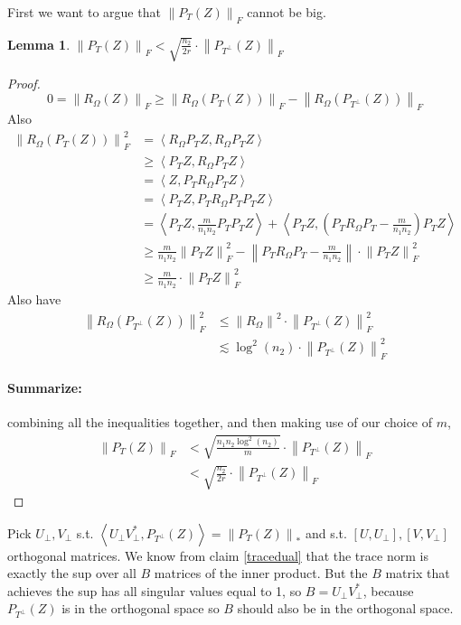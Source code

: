 \documentclass[11pt]{article}
\newcommand{\inprod}[1]{\left\langle #1 \right\rangle}
\newcommand{\norm}[1]{\left\| #1 \right\|}
\newtheorem{lemma}[theorem]{Lemma}
\begin{document}
First we want to argue that $\norm{P_T(Z)}_F$ cannot be big.
\begin{lemma}
\label{boundptz}
$\norm{P_T(Z)}_F  < \sqrt{\frac{n_2}{2r}} \cdot \norm{P_{T^\perp} (Z)}_F$
\end{lemma}
\begin{proof}
 \[ 0 = \norm{R_\Omega (Z)}_F \ge \norm{R_\Omega (P_T (Z)  )}_F - \norm{R_\Omega (P_{T^\perp} (Z))  }_F
\] 
Also
\begin{align*}
\norm{R_\Omega (P_T(Z))}_F^2 &= \inprod{R_\Omega P_T Z, R_\Omega P_T Z} \\
&\ge \inprod{P_T Z, R_\Omega P_T Z} \\
&= \inprod{Z, P_T R_\Omega P_T Z} \\
&= \inprod{ P_T Z, P_T R_\Omega P_T P_T Z} \\
&= \inprod{P_T Z, \frac{m}{n_1 n_2} P_T P_T Z} + \inprod{P_T Z, (P_T R_\Omega P_T - \frac{m}{n_1 n_2}) P_T Z} \\
&\ge \frac{m}{n_1 n_2 } \norm{P_T Z}_F^2 - \norm{P_T R_\Omega P_T - \frac{m}{n_1 n_2}} \cdot \norm{P_T Z}_F^2 \\
&\ge \frac{m}{n_1 n_2} \cdot \norm{P_T Z}_F^2
\end{align*}
Also have 
\begin{align*}
\norm{R_\Omega ( P_{T^\perp} (Z) )}_F^2 &\le \norm{R_\Omega}^2 \cdot \norm{P_{T^\perp} (Z)}_F^2 \\
&\lesssim \log^2(n_2) \cdot \norm{P_{T^\perp} (Z) }_F^2
\end{align*}

\paragraph{Summarize:} combining all the inequalities together, and then making use of our choice of $m$,
\begin{align*}
\norm{P_T (Z)}_F &< \sqrt{ \frac{n_1 n_2 \log^2 (n_2)}{m}  } \cdot \norm{P_{T^\perp} (Z)}_F  \\
& < \sqrt{\frac{n_2}{2r}} \cdot \norm{P_{T^\perp} (Z)}_F
\end{align*}
\end{proof}



 Pick $U_\perp, V_\perp$ s.t. $\inprod{U_\perp V_\perp^*, P_{T^\perp} (Z)} = \norm{P_T(Z)}_*$ and s.t. $[U, U_\perp], [V,V_\perp]$ orthogonal matrices. We know from claim \ref{tracedual} that the trace norm is exactly the sup over all $B$ matrices of the inner product. But the $B$ matrix that achieves the sup has all singular values equal to 1, so $B = U_\perp V_\perp^*$, because $P_{T^\perp} (Z)$ is in the orthogonal space so $B$ should also be in the orthogonal space.
 
\end{document}

